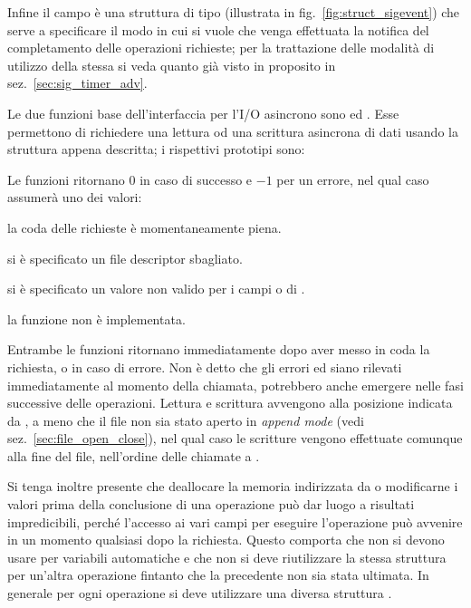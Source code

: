 Infine il campo  è una struttura di tipo 
(illustrata in fig.~\ref{fig:struct_sigevent}) che serve a specificare il modo
in cui si vuole che venga effettuata la notifica del completamento delle
operazioni richieste; per la trattazione delle modalità di utilizzo della
stessa si veda quanto già visto in proposito in sez.~\ref{sec:sig_timer_adv}.

Le due funzioni base dell'interfaccia per l'I/O asincrono sono
 ed .  Esse permettono di richiedere una
lettura od una scrittura asincrona di dati usando la struttura 
appena descritta; i rispettivi prototipi sono:

\begin{funcproto}{
}

{Le funzioni ritornano $0$ in caso di successo e $-1$ per un errore, nel qual
  caso  assumerà uno dei valori: 
  \begin{errlist}
  \item[\errcode{EAGAIN}] la coda delle richieste è momentaneamente piena.
  \item[\errcode{EBADF}] si è specificato un file descriptor sbagliato.
  \item[\errcode{EINVAL}] si è specificato un valore non valido per i campi
     o  di .
  \item[\errcode{ENOSYS}] la funzione non è implementata.
  \end{errlist}
}
\end{funcproto}


Entrambe le funzioni ritornano immediatamente dopo aver messo in coda la
richiesta, o in caso di errore. Non è detto che gli errori  ed
 siano rilevati immediatamente al momento della chiamata,
potrebbero anche emergere nelle fasi successive delle operazioni. Lettura e
scrittura avvengono alla posizione indicata da , a meno che
il file non sia stato aperto in \textit{append mode} (vedi
sez.~\ref{sec:file_open_close}), nel qual caso le scritture vengono effettuate
comunque alla fine del file, nell'ordine delle chiamate a .

Si tenga inoltre presente che deallocare la memoria indirizzata da
 o modificarne i valori prima della conclusione di una
operazione può dar luogo a risultati impredicibili, perché l'accesso ai vari
campi per eseguire l'operazione può avvenire in un momento qualsiasi dopo la
richiesta. Questo comporta che non si devono usare per 
variabili automatiche e che non si deve riutilizzare la stessa struttura per
un'altra operazione fintanto che la precedente non sia stata ultimata. In
generale per ogni operazione si deve utilizzare una diversa struttura
.

